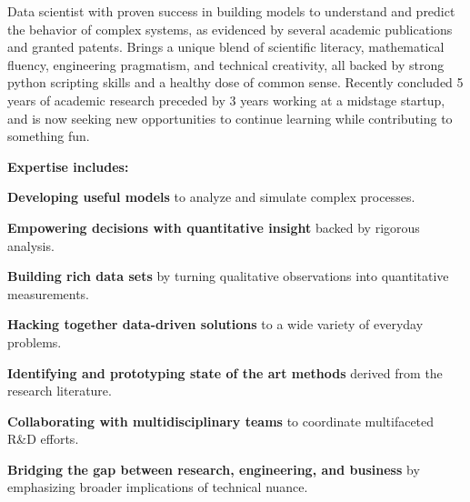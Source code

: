 

\begin{cvparagraph}


Data scientist with proven success in building models to understand and predict the behavior of complex systems, as evidenced by several academic publications and granted patents. Brings a unique blend of scientific literacy, mathematical fluency, engineering pragmatism, and technical creativity, all backed by strong python scripting skills and a healthy dose of common sense. Recently concluded 5 years of academic research preceded by 3 years working at a midstage startup, and is now seeking new opportunities to continue learning while contributing to something fun.

\textbf{Expertise includes:} \newline
\begin{bulletsonly}{
	\vspace{1.5mm}
	\begin{cvitems}
		\item {\textbf{Developing useful models} to analyze and simulate complex processes.\\[-0.8em]}
		\item {\textbf{Empowering decisions with quantitative insight} backed by rigorous analysis.\\[-0.8em]}
		\item {\textbf{Building rich data sets} by turning qualitative observations into quantitative measurements.\\[-0.8em]}
		\item {\textbf{Hacking together data-driven solutions} to a wide variety of everyday problems.\\[-0.8em]}
		\item {\textbf{Identifying and prototyping state of the art methods} derived from the research literature.\\[-0.8em]}
		\item {\textbf{Collaborating with multidisciplinary teams} to coordinate multifaceted R\&D efforts.\\[-0.8em]}
		\item {\textbf{Bridging the gap between research, engineering, and business} by emphasizing broader implications of technical nuance.\\[-0.8em]}
	\end{cvitems}
	}
\end{bulletsonly}

\vspace{-2.0mm}

\end{cvparagraph}
